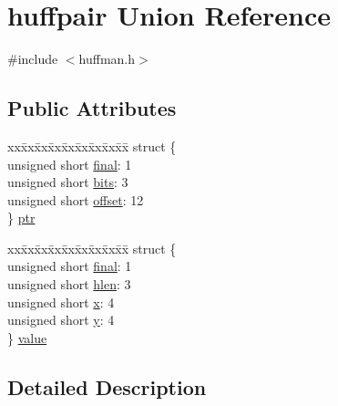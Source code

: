 \hypertarget{unionhuffpair}{}\section{huffpair Union Reference}
\label{unionhuffpair}


{\ttfamily \#include $<$huffman.\+h$>$}

\subsection*{Public Attributes}
\begin{DoxyCompactItemize}
\item 
\begin{tabbing}
xx\=xx\=xx\=xx\=xx\=xx\=xx\=xx\=xx\=\kill
struct \{\\
\>unsigned short \hyperlink{unionhuffpair_ac234f59dfd640386a834b50ec5d88faf}{final}: 1\\
\>unsigned short \hyperlink{unionhuffpair_ae97f3f46cad5db8e4fc9805cfe6735c6}{bits}: 3\\
\>unsigned short \hyperlink{unionhuffpair_ae5ea708b955fee7006f6c6caa387bff9}{offset}: 12\\
\} \hyperlink{unionhuffpair_ad79592953452a9c8ae877dd743ead8ae}{ptr}\\

\end{tabbing}\item 
\begin{tabbing}
xx\=xx\=xx\=xx\=xx\=xx\=xx\=xx\=xx\=\kill
struct \{\\
\>unsigned short \hyperlink{unionhuffpair_ac234f59dfd640386a834b50ec5d88faf}{final}: 1\\
\>unsigned short \hyperlink{unionhuffpair_a59979d160014121c644c34ac85af33e9}{hlen}: 3\\
\>unsigned short \hyperlink{unionhuffpair_a5f710f0abf05d44c1b44604b6866ff22}{x}: 4\\
\>unsigned short \hyperlink{unionhuffpair_ab106e3a601747fd19dc6e161cd87d666}{y}: 4\\
\} \hyperlink{unionhuffpair_a854c78a83d5ca88dfab1cf269f225697}{value}\\

\end{tabbing}\end{DoxyCompactItemize}


\subsection{Detailed Description}


